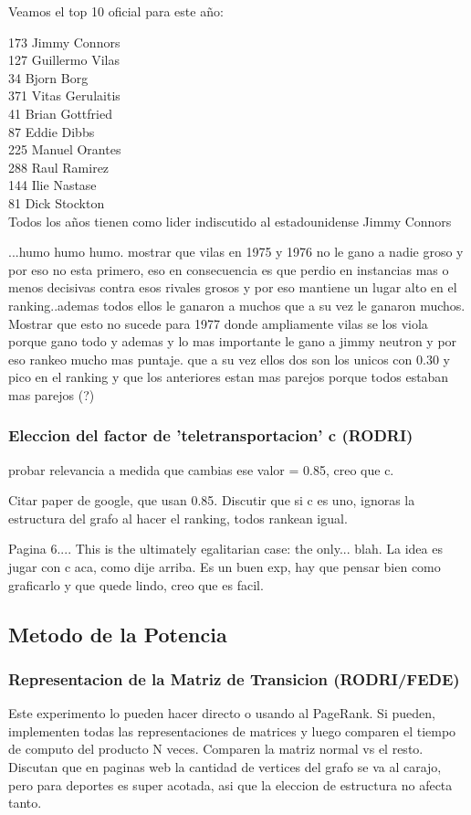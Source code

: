 Veamos el top 10 oficial para este año:


173 Jimmy Connors \\
127 Guillermo Vilas \\
34 Bjorn Borg \\
371 Vitas Gerulaitis \\
41 Brian Gottfried \\
87 Eddie Dibbs \\
225 Manuel Orantes \\
288 Raul Ramirez \\
144 Ilie Nastase \\
81 Dick Stockton \\


Todos los años tienen como lider indiscutido al estadounidense Jimmy Connors


...humo humo humo. mostrar que vilas en 1975 y 1976 no le gano a nadie groso y por eso no esta primero, eso en consecuencia es que perdio en instancias mas o menos decisivas contra esos rivales grosos y por eso mantiene un lugar alto en el ranking..ademas todos ellos le ganaron a muchos que a su vez le ganaron muchos. 
Mostrar que esto no sucede para 1977 donde ampliamente vilas se los viola porque gano todo y ademas y lo mas importante le gano a jimmy neutron y por eso rankeo mucho mas puntaje. que a su vez ellos dos son los unicos con 0.30 y pico en el ranking y que los anteriores estan mas parejos porque todos estaban mas parejos (?) 

\subsubsection{Eleccion del factor de 'teletransportacion' c (RODRI)}
probar relevancia a medida que cambias ese valor = 0.85, creo que c.

Citar paper de google, que usan 0.85. Discutir que si c es uno, ignoras la estructura del grafo al hacer el ranking, todos rankean igual.

Pagina 6.... This is the ultimately egalitarian case: the only... blah. La idea es jugar con c aca, como dije arriba. Es un buen exp, hay que pensar bien como graficarlo y que quede lindo, creo que es facil.

\subsection{Metodo de la Potencia}

\subsubsection{Representacion de la Matriz de Transicion (RODRI/FEDE)}
Este experimento lo pueden hacer directo o usando al PageRank. Si pueden, implementen todas las representaciones de matrices y luego comparen el tiempo de computo del producto N veces. Comparen la matriz normal vs el resto. Discutan que en paginas web la cantidad de vertices del grafo se va al carajo, pero para deportes es super acotada, asi que la eleccion de estructura no afecta tanto.

